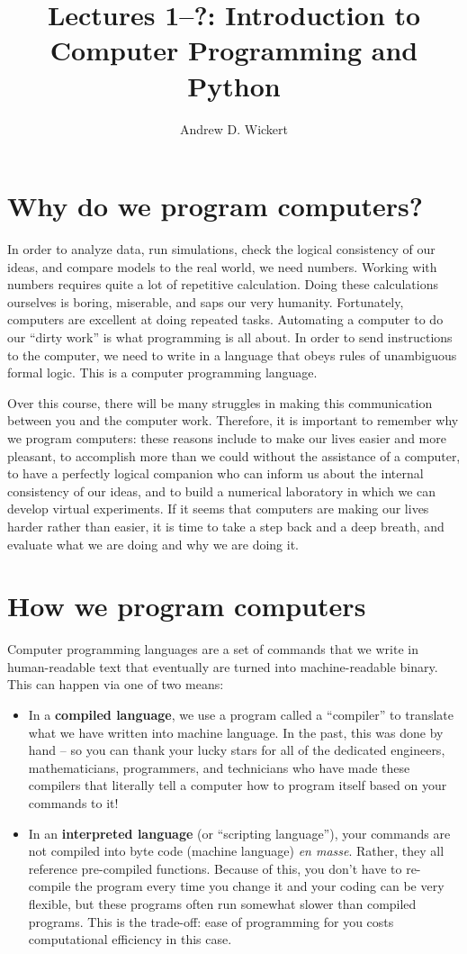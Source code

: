 \documentclass[a4paper,10pt]{scrartcl}
\title{Lectures 1--?: Introduction to Computer Programming and Python}
\author{Andrew D. Wickert}
\begin{document}
\maketitle

\section{Why do we program computers?}

In order to analyze data, run simulations, check the logical consistency of our ideas, and compare models to the real world, we need numbers. Working with numbers requires quite a lot of repetitive calculation. Doing these calculations ourselves is boring, miserable, and saps our very humanity. Fortunately, computers are excellent at doing repeated tasks. Automating a computer to do our ``dirty work'' is what programming is all about. In order to send instructions to the computer, we need to write in a language that obeys rules of unambiguous formal logic. This is a computer programming language.

Over this course, there will be many struggles in making this communication between you and the computer work. Therefore, it is important to remember why we program computers: these reasons include to make our lives easier and more pleasant, to accomplish more than we could without the assistance of a computer, to have a perfectly logical companion who can inform us about the internal consistency of our ideas, and to build a numerical laboratory in which we can develop virtual experiments. If it seems that computers are making our lives harder rather than easier, it is time to take a step back and a deep breath, and evaluate what we are doing and why we are doing it.

\section{How we program computers}

Computer programming languages are a set of commands that we write in human-readable text that eventually are turned into machine-readable binary. This can happen via one of two means:
\begin{itemize}
 \item In a \textbf{compiled language}, we use a program called a ``compiler'' to translate what we have written into machine language. In the past, this was done by hand -- so you can thank your lucky stars for all of the dedicated engineers, mathematicians, programmers, and technicians who have made these compilers that literally tell a computer how to program itself based on your commands to it!
 \item In an \textbf{interpreted language} (or ``scripting language''), your commands are not compiled into byte code (machine language) \textit{en masse}. Rather, they all reference pre-compiled functions. Because of this, you don't have to re-compile the program every time you change it and your coding can be very flexible, but these programs often run somewhat slower than compiled programs. This is the trade-off: ease of programming for you costs computational efficiency in this case.
\end{itemize}
\end{document}
